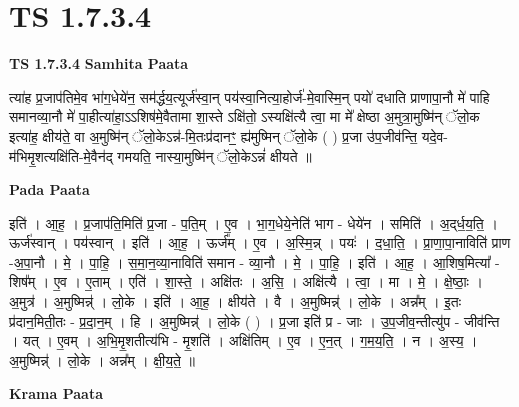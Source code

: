 \documentclass[17pt]{extarticle}
\begin{document}
\section{ TS 1.7.3.4 }

\textbf{TS 1.7.3.4 } \newline
\textbf{Samhita Paata} \newline

त्या॑ह प्र॒जाप॑तिमे॒व भा॑ग॒धेये॑न॒ सम॑र्द्धय॒त्यूर्ज॑स्वा॒न् पय॑स्वा॒नित्या॒होर्ज॑-मे॒वास्मि॒न् पयो॑ दधाति प्राणापा॒नौ मे॑ पाहि समानव्या॒नौ मे॑ पा॒हीत्या॑हा॒ऽऽशिष॑मे॒वैतामा शा॒स्ते ऽक्षि॑तो॒ ऽस्यक्षि॑त्यै त्वा॒ मा मे᳚ क्षेष्ठा अ॒मुत्रा॒मुष्मि॑न् ॅलो॒क इत्या॑ह॒ क्षीय॑ते॒ वा अ॒मुष्मि॑न् ॅलो॒केऽन्न॑-मि॒तःप्र॑दानꣳ॒॒ ह्य॑मुष्मिन् ॅलो॒के ( ) प्र॒जा उ॑प॒जीव॑न्ति॒ यदे॒व-म॑भिमृ॒शत्यक्षि॑ति-मे॒वैन॑द् गमयति॒ नास्या॒मुष्मि॑न् ॅलो॒केऽन्नं॑ क्षीयते ॥ \newline

\textbf{Pada Paata} \newline

इति॑ । आ॒ह॒ । प्र॒जाप॑ति॒मिति॑ प्र॒जा - प॒ति॒म् । ए॒व । भा॒ग॒धेये॒नेति॑ भाग - धेये॑न । समिति॑ । अ॒द्‌र्ध॒य॒ति॒ । ऊर्ज॑स्वान् । पय॑स्वान् । इति॑ । आ॒ह॒ । ऊर्ज᳚म् । ए॒व । अ॒स्मि॒न्न् । पयः॑ । द॒धा॒ति॒ । प्रा॒णा॒पा॒नाविति॑ प्राण -अ॒पा॒नौ । मे॒ । पा॒हि॒ । स॒मा॒न॒व्या॒नाविति॑ समान - व्या॒नौ । मे॒ । पा॒हि॒ । इति॑ । आ॒ह॒ । आ॒शिष॒मित्या᳚ - शिष᳚म् । ए॒व । ए॒ताम् । एति॑ । शा॒स्ते॒ । अक्षि॑तः । अ॒सि॒ । अक्षि॑त्यै । त्वा॒ । मा । मे॒ । क्षे॒ष्ठाः॒ । अ॒मुत्र॑ । अ॒मुष्मिन्न्॑ । लो॒के । इति॑ । आ॒ह॒ । क्षीय॑ते । वै । अ॒मुष्मिन्न्॑ । लो॒के । अन्न᳚म् । इ॒तः प्र॑दान॒मिती॒तः - प्र॒दा॒न॒म् । हि । अ॒मुष्मिन्न्॑ । लो॒के ( ) । प्र॒जा इति॑ प्र - जाः । उ॒प॒जीव॒न्तीत्यु॑प - जीव॑न्ति । यत् । ए॒वम् । अ॒भि॒मृ॒शतीत्य॑भि - मृ॒शति॑ । अक्षि॑तिम् । ए॒व । ए॒न॒त् । ग॒म॒य॒ति॒ । न । अ॒स्य॒ । अ॒मुष्मिन्न्॑ । लो॒के । अन्न᳚म् । क्षी॒य॒ते॒ ॥  \newline


\textbf{Krama Paata} \newline
\end{document}
